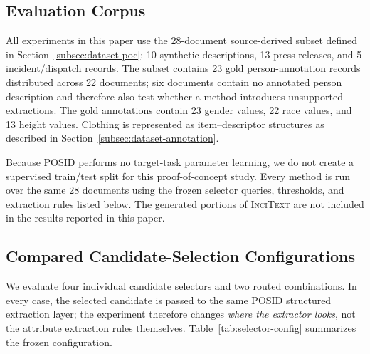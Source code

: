 \documentclass[sigconf,nonacm]{acmart}
\newcommand{\posid}{\textsc{POSID}}
\newcommand{\incitext}{\textsc{InciText}}
\begin{document}
\subsection{Evaluation Corpus}
\label{subsec:experimental-corpus}

All experiments in this paper use the 28-document source-derived subset defined
in Section~\ref{subsec:dataset-poc}: 10 synthetic descriptions, 13 press
releases, and 5 incident/dispatch records.  The subset contains 23 gold
person-annotation records distributed across 22 documents; six documents
contain no annotated person description and therefore also test whether a
method introduces unsupported extractions.  The gold annotations contain 23
gender values, 22 race values, and 13 height values.  Clothing is represented
as item--descriptor structures as described in
Section~\ref{subsec:dataset-annotation}.

Because \posid{} performs no target-task parameter learning, we do not create a
supervised train/test split for this proof-of-concept study.  Every method is
run over the same 28 documents using the frozen selector queries, thresholds,
and extraction rules listed below.  The generated portions of \incitext{} are
not included in the results reported in this paper.

\subsection{Compared Candidate-Selection Configurations}
\label{subsec:experimental-methods}

We evaluate four individual candidate selectors and two routed combinations.
In every case, the selected candidate is passed to the same \posid{} structured
extraction layer; the experiment therefore changes \emph{where the extractor
looks}, not the attribute extraction rules themselves.  Table~\ref{tab:selector-config}
summarizes the frozen configuration.
\end{document}
